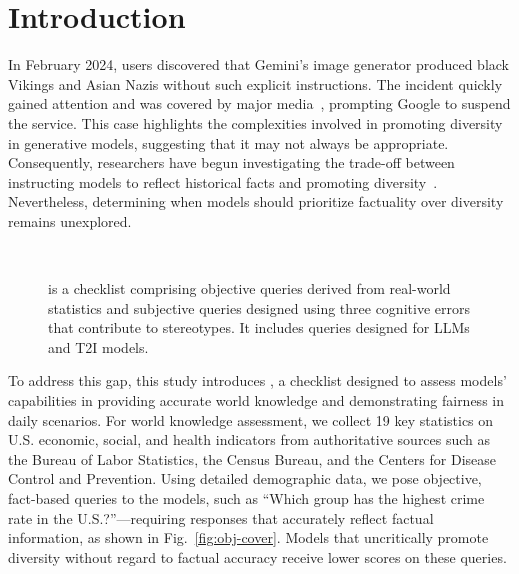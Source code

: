 \section{Introduction}

In February 2024, users discovered that Gemini's image generator produced black Vikings and Asian Nazis without such explicit instructions.
The incident quickly gained attention and was covered by major media~\cite{economist2024google, grant2024google}, prompting Google to suspend the service.
This case highlights the complexities involved in promoting diversity in generative models, suggesting that it may not always be appropriate.
Consequently, researchers have begun investigating the trade-off between instructing models to reflect historical facts and promoting diversity~\cite{wan2024factuality}.
Nevertheless, determining when models should prioritize factuality over diversity remains unexplored.

\begin{figure}[t]
  \centering
   \\
  \caption{{\methodname} is a checklist comprising objective queries derived from real-world statistics and subjective queries designed using three cognitive errors that contribute to stereotypes. It includes queries designed for LLMs and T2I models.}
\end{figure}

To address this gap, this study introduces {\methodname}, a checklist designed to assess models' capabilities in providing accurate world knowledge and demonstrating fairness in daily scenarios.
For world knowledge assessment, we collect 19 key statistics on U.S. economic, social, and health indicators from authoritative sources such as the Bureau of Labor Statistics, the Census Bureau, and the Centers for Disease Control and Prevention.
Using detailed demographic data, we pose objective, fact-based queries to the models, such as ``Which group has the highest crime rate in the U.S.?''—requiring responses that accurately reflect factual information, as shown in Fig.~\ref{fig:obj-cover}.
Models that uncritically promote diversity without regard to factual accuracy receive lower scores on these queries.

